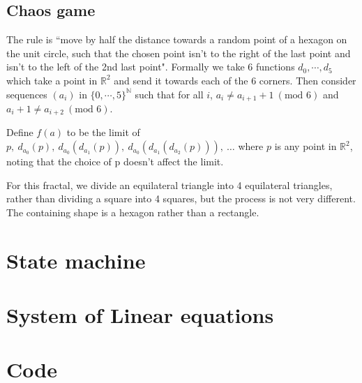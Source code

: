 \documentclass{article}
\newcommand{\bounding}{
\draw[tsty] (-2.5,1) -- (-1.5,0) -- (2.5,0) -- (3.5,1) -- (3.5,2.5) -- (2,4) -- (-1,4) -- (-2.5, 2.5) -- cycle;
}
\newcommand{\subt}[2]{
    \begin{scope}[yshift=1cm,rotate=45,scale=0.7071]
        #1
    \end{scope}
    \begin{scope}[xshift=0.5cm,yshift=1.5cm,rotate=-45,scale=0.7071]
        #2
    \end{scope}
}
\newcommand{\dup}[1]{\subt{#1}{#1}}
\newcommand{\gtree}[3]{
	#2
	\ifthenelse{#1<2}{
		#3
	}{
		\dup{\gtree{\the\numexpr#1-1}{#2}{#3}}
	}
}
\newcommand{\tree}[1]{
	\gtree{#1}{\fill[tsty] (0,0) -- (1,0) -- (1,1) -- (0,1) -- cycle;}{}
}
\newcommand{\outertree}[1]{
	\gtree{#1}{
		\fill[tsty] (0,0) -- (1,0) -- (1,1) -- (0,1) -- cycle;
	}{\bounding}
}
\newcommand{\depth}{5}%
\begin{document}
\label{sec:chaos}
\subsection{Chaos game}

The rule is ``move by half the distance towards a random point of a hexagon on the unit circle, such that the chosen point isn't to the right of the last point and isn't to the left of the 2nd last point". Formally we take 6 functions $d_0,\cdots, d_5$ which take a point in $\mathbb{R}^2$ and send it towards each of the 6 corners. Then consider sequences $(a_i)$ in $\{0,\cdots,5\}^\mathbb{N}$ such that for all $i$, $a_i\ne a_{i+1}+1\ (\textrm{mod }6)$ and $a_i+1\ne a_{i+2}\ (\textrm{mod }6)$. 

Define $f(a)$ to be the limit of $p,\ d_{a_0}(p),\ d_{a_0}(d_{a_1}(p)),\ d_{a_0}(d_{a_1}(d_{a_2}(p))),\ \dots$ where $p$ is any point in $\mathbb{R}^2$, noting that the choice of p doesn't affect the limit.

For this fractal, we divide an equilateral triangle into 4 equilateral triangles, rather than dividing a square into 4 squares, but the process is not very different. The containing shape is a hexagon rather than a rectangle. 

\appendix
\section{State machine}
\section{System of Linear equations}
\section{Code}



\end{document}

